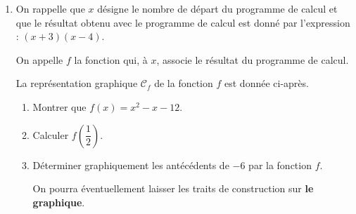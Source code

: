 \documentclass[a4paper,12pt]{article}
\begin{document}
\begin{enumerate}[resume]
\item On rappelle que $x$ désigne le nombre de départ du programme de calcul et que le résultat obtenu avec le programme de calcul est donné par l'expression : $(x + 3)(x - 4)$.

On appelle $f$ la fonction qui, à $x$, associe le résultat du programme de calcul.

La représentation graphique $\mathcal{C}_f$ de la fonction $f$ est donnée ci-après.
  \begin{enumerate}[label=\alph*., itemsep=3pt]
    \item Montrer que $f(x) = x^2 - x - 12$.
    \item Calculer $f\!\left(\dfrac{1}{2}\right)$.
    \item Déterminer graphiquement les antécédents de $-6$ par la fonction $f$.

    On pourra éventuellement laisser les traits de construction sur \textbf{le graphique}.
  \end{enumerate}
\end{enumerate}

\begin{center}
\end{center}
\end{document}
